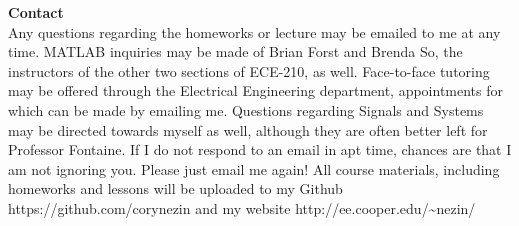 \documentclass[12pt]{article}
\begin{document}
\textbf{Contact}\\
Any questions regarding the homeworks or lecture may be emailed to me at any time.
MATLAB inquiries may be made of Brian Forst and Brenda So, the instructors of the other two
sections of ECE-210, as well. Face-to-face tutoring may be offered through the Electrical Engineering department, appointments for which can be made by emailing me. Questions regarding
Signals and Systems may be directed towards myself as well, although they are often better left for
Professor Fontaine. If I do not respond to an email in apt time, chances are that I am not ignoring
you. Please just email me again!
All course materials, including homeworks and lessons will be uploaded to my Github https://github.com/corynezin and my website http://ee.cooper.edu/\textasciitilde nezin/
\end{document}
